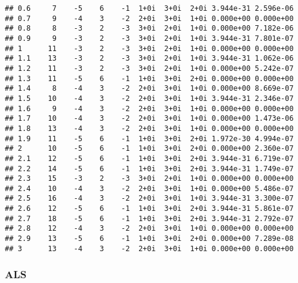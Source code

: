 \documentclass[
  12pt,
]{article}
\begin{document}
\begin{verbatim}
## 0.6     7    -5    6    -1  1+0i  3+0i  2+0i 3.944e-31 2.596e-06
## 0.7     9    -4    3    -2  2+0i  3+0i  1+0i 0.000e+00 0.000e+00
## 0.8     8    -3    2    -3  3+0i  2+0i  1+0i 0.000e+00 7.182e-06
## 0.9     9    -3    2    -3  3+0i  2+0i  1+0i 3.944e-31 7.801e-07
## 1      11    -3    2    -3  3+0i  2+0i  1+0i 0.000e+00 0.000e+00
## 1.1    13    -3    2    -3  3+0i  2+0i  1+0i 3.944e-31 1.062e-06
## 1.2    11    -3    2    -3  3+0i  2+0i  1+0i 0.000e+00 5.242e-07
## 1.3    11    -5    6    -1  1+0i  3+0i  2+0i 0.000e+00 0.000e+00
## 1.4     8    -4    3    -2  2+0i  3+0i  1+0i 0.000e+00 8.669e-07
## 1.5    10    -4    3    -2  2+0i  3+0i  1+0i 3.944e-31 2.346e-07
## 1.6     9    -4    3    -2  2+0i  3+0i  1+0i 0.000e+00 0.000e+00
## 1.7    10    -4    3    -2  2+0i  3+0i  1+0i 0.000e+00 1.473e-06
## 1.8    13    -4    3    -2  2+0i  3+0i  1+0i 0.000e+00 0.000e+00
## 1.9    11    -5    6    -1  1+0i  3+0i  2+0i 1.972e-30 4.994e-07
## 2      10    -5    6    -1  1+0i  3+0i  2+0i 0.000e+00 2.360e-07
## 2.1    12    -5    6    -1  1+0i  3+0i  2+0i 3.944e-31 6.719e-07
## 2.2    14    -5    6    -1  1+0i  3+0i  2+0i 3.944e-31 1.749e-07
## 2.3    15    -3    2    -3  3+0i  2+0i  1+0i 0.000e+00 0.000e+00
## 2.4    10    -4    3    -2  2+0i  3+0i  1+0i 0.000e+00 5.486e-07
## 2.5    16    -4    3    -2  2+0i  3+0i  1+0i 3.944e-31 3.300e-07
## 2.6    12    -5    6    -1  1+0i  3+0i  2+0i 3.944e-31 5.861e-07
## 2.7    18    -5    6    -1  1+0i  3+0i  2+0i 3.944e-31 2.792e-07
## 2.8    12    -4    3    -2  2+0i  3+0i  1+0i 0.000e+00 0.000e+00
## 2.9    13    -5    6    -1  1+0i  3+0i  2+0i 0.000e+00 7.289e-08
## 3      13    -4    3    -2  2+0i  3+0i  1+0i 0.000e+00 0.000e+00
\end{verbatim}

\normalsize

\subsubsection{ALS}\label{als}

\footnotesize
\end{document}
